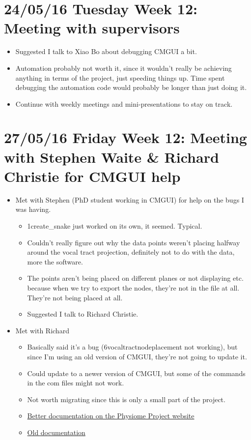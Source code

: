 \documentclass{article}
\begin{document}
\section*{24/05/16 Tuesday Week 12: Meeting with supervisors}
\begin{itemize}
    \item Suggested I talk to Xiao Bo about debugging CMGUI a bit.
    \item Automation probably not worth it, since it wouldn't really be achieving anything in terms of the project, just speeding things up. Time spent debugging the automation code would probably be longer than just doing it.
    \item Continue with weekly meetings and mini-presentations to stay on track.
\end{itemize}

\section*{27/05/16 Friday Week 12: Meeting with Stephen Waite \& Richard Christie for CMGUI help}
\begin{itemize}
    \item Met with Stephen (PhD student working in CMGUI) for help on the bugs I was having.
    \begin{itemize}
        \item 1create\_snake just worked on its own, it seemed. Typical.
        \item Couldn't really figure out why the data points weren't placing halfway around the vocal tract projection, definitely not to do with the data, more the software. 
        \item The points aren't being placed on different planes or not displaying etc. because when we try to export the nodes, they're not in the file at all. They're not being placed at all.
        \item Suggested I talk to Richard Christie.
    \end{itemize}
    \item Met with Richard
    \begin{itemize}
        \item Basically said it's a bug (6vocaltractnodeplacement not working), but since I'm using an old version of CMGUI, they're not going to update it.
        \item Could update to a newer version of CMGUI, but some of the commands in the com files might not work.
        \item Not worth migrating since this is only a small part of the project.
        \item \href{http://physiomeproject.org/software/opencmiss/cmgui/documentation}{Better documentation on the Physiome Project website}
        \item \href{http://www.cmiss.org/cmgui}{Old documentation}
    \end{itemize}
\end{itemize}
\end{document}
